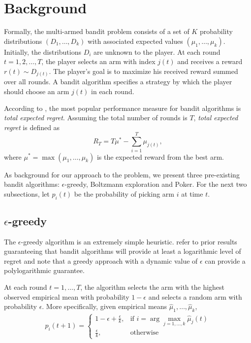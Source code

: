 \documentclass[12pt]{article}
\begin{document}
\section{Background}
Formally, the multi-armed bandit problem consists of a set of $K$ probability distributions
$(D_1, \ldots, D_k)$ with associated expected values $(\mu_1, \ldots, \mu_k)$.
Initially, the distributions $D_i$ are unknown to the player.  At each round $t = 1,2,\ldots,T$, the player selects an arm with index $j(t)$
and receives a reward $r(t) \sim D_{j(t)}$. The player's goal is to maximize his received reward summed over all rounds.  A bandit algorithm
specifies a strategy by which the player should choose an arm $j(t)$ in each round.

According to \cite{Kuleshov}, the most popular performance measure for bandit algorithms is \emph{total expected regret}.  Assuming the 
total number of rounds is $T$, \emph{total expected regret} is defined as
$$
R_T = T\mu^{*} - \sum_{i=1}^{T} \mu_{j(t)},
$$
where $\mu^{*} = \max(\mu_1, \ldots, \mu_k)$ is the expected reward from the best arm. 

As background for our approach to the problem, we present three pre-existing bandit algorithms: $\epsilon$-greedy, Boltzmann exploration and Poker.
For the next two subsections, let $p_i(t)$ be the probability of picking arm $i$ at time $t$.

\subsection{$\epsilon$-greedy}

The $\epsilon$-greedy algorithm is an extremely simple heuristic. \cite{Auer} refer to prior results guaranteeing that bandit algorithms will provide at least a logarithmic level of regret and note that a greedy approach with a dynamic value of $\epsilon$ can provide a polylogarithmic guarantee.

At each round $t = 1, \ldots, T$, the algorithm selects the arm with the highest observed empirical mean with probability $1 - \epsilon$ and
selects a random arm with probability $\epsilon$.  More specifically, given empirical means $\hat{\mu}_1, \ldots, \hat{\mu}_k$,
\begin{align*}
p_i(t+1) = 
\begin{cases}
1 - \epsilon + \frac{\epsilon}{k}, & \textrm{if } i = \arg \max_{j = 1, \ldots, k} \hat{\mu}_j(t) \\
\frac{\epsilon}{k}, & \textrm{otherwise}
\end{cases}
\end{align*}
\end{document}
